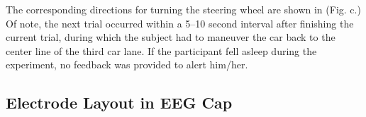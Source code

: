 \documentclass[letterpaper]{article}
\begin{document}
The corresponding directions for turning the steering wheel are shown in (Fig. c.) Of note, the next trial occurred
within a 5–10 second interval after finishing the current trial, during which the subject had to maneuver the car back
to the center line of the third car lane. If the participant fell asleep during the experiment, no feedback was
provided to alert him/her.


\bigskip

\subsection{Electrode Layout in EEG Cap}
\centering
{}
\par

\bigskip

\centering
{}
\par
\end{document}
